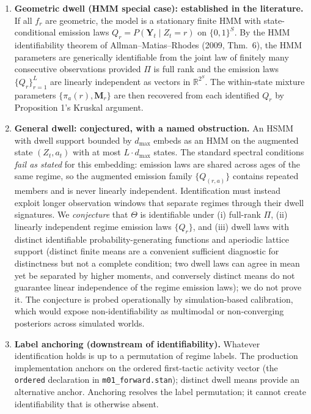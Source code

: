 \documentclass[11pt,a4paper]{article}
\begin{document}
\begin{enumerate}
    \item \textbf{Geometric dwell (HMM special case): established in the literature.} If all $f_r$ are geometric, the model is a stationary finite HMM with state-conditional emission laws $Q_r = P(\mathbf{Y}_t \mid Z_t = r)$ on $\{0, 1\}^S$. By the HMM identifiability theorem of Allman--Matias--Rhodes (2009, Thm.~6), the HMM parameters are generically identifiable from the joint law of finitely many consecutive observations provided $\Pi$ is full rank and the emission laws $\{Q_r\}_{r=1}^L$ are linearly independent as vectors in $\mathbb{R}^{2^S}$. The within-state mixture parameters $\{\pi_a(r), \mathbf{M}_r\}$ are then recovered from each identified $Q_r$ by Proposition 1's Kruskal argument. %
    \item \textbf{General dwell: conjectured, with a named obstruction.} An HSMM with dwell support bounded by $d_{\max}$ embeds as an HMM on the augmented state $(Z_t, a_t)$ with at most $L \cdot d_{\max}$ states. The standard spectral conditions \emph{fail as stated} for this embedding: emission laws are shared across ages of the same regime, so the augmented emission family $\{Q_{(r, a)}\}$ contains repeated members and is never linearly independent. Identification must instead exploit longer observation windows that separate regimes through their dwell signatures. We \emph{conjecture} that $\Theta$ is identifiable under (i) full-rank $\Pi$, (ii) linearly independent regime emission laws $\{Q_r\}$, and (iii) dwell laws with distinct identifiable probability-generating functions and aperiodic lattice support (distinct finite means are a convenient sufficient diagnostic for distinctness but not a complete condition; two dwell laws can agree in mean yet be separated by higher moments, and conversely distinct means do not guarantee linear independence of the regime emission laws); we do not prove it. The conjecture is probed operationally by simulation-based calibration, which would expose non-identifiability as multimodal or non-converging posteriors across simulated worlds. %
    \item \textbf{Label anchoring (downstream of identifiability).} Whatever identification holds is up to a permutation of regime labels. The production implementation anchors on the ordered first-tactic activity vector (the \texttt{ordered} declaration in \texttt{m01\_forward.stan}); distinct dwell means provide an alternative anchor. Anchoring resolves the label permutation; it cannot create identifiability that is otherwise absent. %
\end{enumerate}
\end{document}
